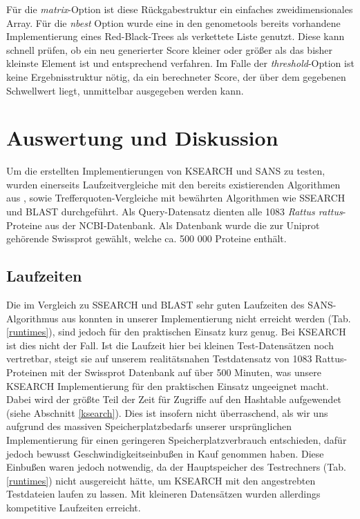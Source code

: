 \documentclass{article}
\begin{document}
Für die \emph{matrix}-Option ist diese Rückgabestruktur ein einfaches zweidimensionales Array. Für die \emph{nbest} Option wurde eine in den genometools
bereits vorhandene Implementierung eines Red-Black-Trees als verkettete Liste genutzt. Diese kann schnell prüfen, ob ein neu generierter Score kleiner oder
größer als das bisher kleinste Element ist und entsprechend verfahren. Im Falle der \emph{threshold}-Option ist keine Ergebnisstruktur nötig,
da ein berechneter Score, der über dem gegebenen Schwellwert liegt, unmittelbar ausgegeben werden kann.

\section{Auswertung und Diskussion}

Um die erstellten Implementierungen von KSEARCH und SANS zu testen, wurden einerseits Laufzeitvergleiche mit den bereits existierenden Algorithmen aus \cite{Holm}, sowie Trefferquoten-Vergleiche mit bewährten Algorithmen wie SSEARCH und BLAST durchgeführt. Als Query-Datensatz dienten alle 1083 \textit{Rattus rattus}-Proteine aus der NCBI-Datenbank. Als Datenbank wurde die zur Uniprot gehörende Swissprot gewählt, welche ca. 500 000 Proteine enthält.

\subsection{Laufzeiten}

Die im Vergleich zu SSEARCH und BLAST sehr guten Laufzeiten des SANS-Algorithmus aus \cite{Holm}
konnten in unserer Implementierung nicht erreicht werden (Tab. \ref{runtimes}), sind jedoch für den praktischen Einsatz kurz genug.
Bei KSEARCH ist dies nicht der Fall. Ist die Laufzeit hier bei kleinen Test-Datensätzen noch vertretbar, steigt sie auf unserem realitätsnahen
Testdatensatz von 1083 Rattus-Proteinen mit der Swissprot Datenbank auf über 500 Minuten, was unsere KSEARCH Implementierung für den
praktischen Einsatz ungeeignet macht. Dabei wird der größte Teil der Zeit für Zugriffe auf den Hashtable aufgewendet (siehe Abschnitt \ref{ksearch}). Dies ist insofern nicht
überraschend, als wir uns aufgrund des massiven Speicherplatzbedarfs unserer ursprünglichen Implementierung für einen geringeren
Speicherplatzverbrauch entschieden, dafür jedoch bewusst Geschwindigkeitseinbußen in Kauf genommen haben. Diese Einbußen waren jedoch notwendig, da der Hauptspeicher des Testrechners (Tab. \ref{runtimes}) nicht ausgereicht hätte, um KSEARCH mit den angestrebten Testdateien laufen zu lassen. Mit kleineren Datensätzen wurden allerdings kompetitive Laufzeiten erreicht.
\end{document}
